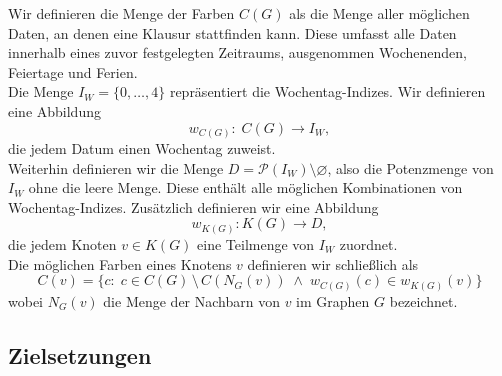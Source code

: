 Wir definieren die Menge der Farben $C(G)$ als die Menge aller möglichen Daten, an denen eine Klausur stattfinden kann. Diese umfasst alle Daten innerhalb eines zuvor festgelegten Zeitraums, ausgenommen Wochenenden, Feiertage und Ferien.\\
Die Menge $I_W = \{0, \dots, 4\}$ repräsentiert die Wochentag-Indizes. Wir definieren eine Abbildung 
$$ w_{C(G)} \colon \; C(G) \rightarrow I_W, $$
die jedem Datum einen Wochentag zuweist.\\
Weiterhin definieren wir die Menge $ D = \mathcal{P}(I_W) \setminus \varnothing$, also die Potenzmenge von $I_W$ ohne die leere Menge. Diese enthält alle möglichen Kombinationen von Wochentag-Indizes. Zusätzlich definieren wir eine Abbildung 
$$ w_{K(G)} \colon K(G) \rightarrow D, $$
die jedem Knoten $v \in K(G)$ eine Teilmenge von $I_W$ zuordnet.\\
Die möglichen Farben eines Knotens $v$ definieren wir schließlich als
$$
C(v)= \{ c \colon \; c \in C(G) \, \setminus \, C(N_G(v)) \; \wedge \; w_{C(G)}(c) \in w_{K(G)}(v)\}
$$
wobei $N_G(v)$ die Menge der Nachbarn von $v$ im Graphen $G$ bezeichnet. 

\subsection{Zielsetzungen}